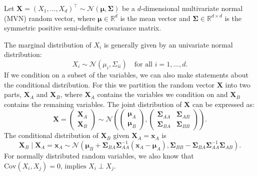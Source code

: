 Let $\boldsymbol{X} = (X_1, \dots, X_d)^\top \sim \mathcal{N}(\boldsymbol{\mu}, \boldsymbol{\Sigma})$ be a $d$-dimensional multivariate normal (MVN) random vector, where $\boldsymbol{\mu} \in \mathbb{R}^d$ is the mean vector and $\boldsymbol{\Sigma} \in \mathbb{R}^{d \times d}$ is the symmetric positive semi-definite covariance matrix.\par

The marginal distribution of $X_i$ is generally given by an univariate normal distribution:
\[
 X_i \sim \mathcal{N}(\mu_i, \Sigma_{ii}) \quad \text{for all } i = 1, \dots, d.
\]
If we condition on a subset of the variables, we can also make statements about the conditional distribution. For this we partition the random vector $\boldsymbol{X}$ into two parts, $\boldsymbol{X}_A$ and $\boldsymbol{X}_B$, where $\boldsymbol{X}_A$ contains the variables we condition on and $\boldsymbol{X}_B$ contains the remaining variables. The joint distribution of $\boldsymbol{X}$ can be expressed as:
    \[
    \boldsymbol{X} = 
    \begin{pmatrix}
    \boldsymbol{X}_A \\
    \boldsymbol{X}_B
    \end{pmatrix}
    \sim \mathcal{N}\left(
    \begin{pmatrix}
    \boldsymbol{\mu}_A \\
    \boldsymbol{\mu}_B
    \end{pmatrix},
    \begin{pmatrix}
    \boldsymbol{\Sigma}_{AA} & \boldsymbol{\Sigma}_{AB} \\
    \boldsymbol{\Sigma}_{BA} & \boldsymbol{\Sigma}_{BB}
    \end{pmatrix}
    \right).
    \]
The conditional distribution of $\boldsymbol{X}_B$ given $\boldsymbol{X}_A = \boldsymbol{x}_A$ is
    \[
    \boldsymbol{X}_B \mid \boldsymbol{X}_A = \boldsymbol{x}_A \sim 
    \mathcal{N} \left(
    \boldsymbol{\mu}_B + \boldsymbol{\Sigma}_{BA} \boldsymbol{\Sigma}_{AA}^{-1} (\boldsymbol{x}_A - \boldsymbol{\mu}_A),
    \boldsymbol{\Sigma}_{BB} - \boldsymbol{\Sigma}_{BA} \boldsymbol{\Sigma}_{AA}^{-1} \boldsymbol{\Sigma}_{AB}
    \right).
    \]
For normally distributed random variables, we also know that \(\text{Cov}(X_i, X_j) = 0 \text{, implies } X_i \perp X_j\).
